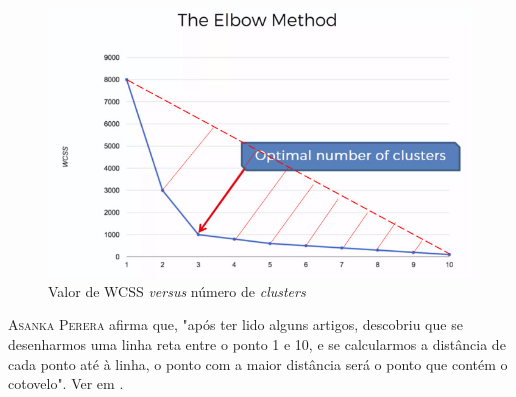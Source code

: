 \documentclass[12pt, a4paper, oneside]{scrreport}
\begin{document}
\begin{figure}[h!]
    \centering
    \includegraphics[scale=0.6]{3.png}
    \caption{Valor de WCSS \textit{versus} número de \textit{clusters}}   
    \label{wrapfig:wcss_k}
\end{figure}

\textsc{Asanka Perera} afirma que, "após ter lido alguns artigos, descobriu que se desenharmos uma
linha reta entre o ponto 1 e 10, e se calcularmos a distância de cada ponto até à linha, o ponto com
a maior distância será o ponto que contém o cotovelo". Ver em \cite{asanka}.
\end{document}
